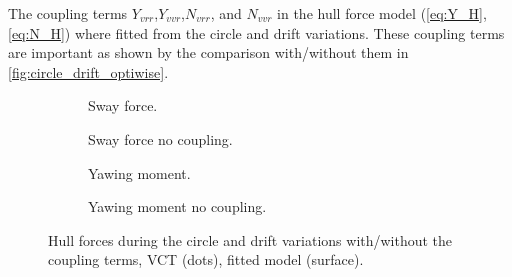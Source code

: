 The coupling terms $Y_{vrr}$,$Y_{vvr}$,$N_{vrr}$, and $N_{vvr}$ in the hull force model (\autoref{eq:Y_H}, \autoref{eq:N_H}) where fitted from the circle and drift variations. These coupling terms are important as shown by the comparison with/without them in \autoref{fig:circle_drift_optiwise}.
\begin{figure}[h]
     \centering
     \begin{subfigure}[b]{0.49\textwidth}
         \centering
         
        \caption{Sway force.}
        \label{fig:circle_drift_Y_H_optiwise}
     \end{subfigure}
     \hfill
     \begin{subfigure}[b]{0.49\textwidth}
         \centering
         
        \caption{Sway force no coupling.}
        \label{fig:circle_drift_Y_H_no_coupling_optiwise}
     \end{subfigure}

     \vfill
     \begin{subfigure}[b]{0.49\textwidth}
         \centering
         
        \caption{Yawing moment.}
        \label{fig:circle_drift_N_H_optiwise}
     \end{subfigure}
     \hfill
     \begin{subfigure}[b]{0.49\textwidth}
         \centering
         
        \caption{Yawing moment no coupling.}
        \label{fig:circle_drift_N_H_no_coupling_optiwise}
     \end{subfigure}
     
    \caption{Hull forces during the circle and drift variations with/without the coupling terms, VCT (dots), fitted model (surface).}
    \label{fig:circle_drift_optiwise}
\end{figure}

